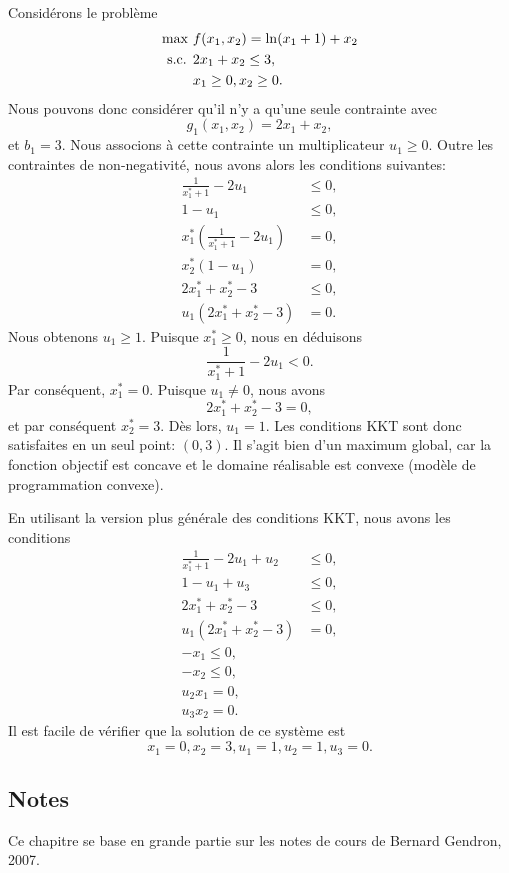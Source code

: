 \begin{example}
Considérons le problème
\begin{align*}
\max\ & f(x_1,x_2) = \ln(x_1 +1) + x_2\\
\mbox{s.c. } & 2x_1 + x_2 \leq 3, \\
& x_1 \geq 0, x_2 \geq 0.
\end{align*}
Nous pouvons donc considérer qu'il n'y a qu'une seule contrainte avec
\[
g_1(x_1,x_2) = 2x_1 + x_2,
\]
et $b_1 = 3$.
Nous associons à cette contrainte un multiplicateur $u_1 \geq 0$.
Outre les contraintes de non-negativité, nous avons alors les conditions suivantes:
\begin{align*}
\frac{1}{x_1^*+1} - 2u_1 &\leq 0, \\
1-u_1 &\leq 0, \\
x_1^* \left( \frac{1}{x_1^*+1} - 2u_1 \right) &= 0, \\
x_2^*(1-u_1) &= 0, \\
2x_1^*+x_2^*-3 &\leq 0, \\
u_1(2x_1^*+x_2^*-3) &= 0.
\end{align*}
Nous obtenons $u_1 \geq 1$. Puisque $x_1^* \geq 0$, nous en déduisons
\[
\frac{1}{x_1^*+1} - 2u_1 < 0.
\]
Par conséquent, $x_1^* = 0$.
Puisque $u_1 \ne 0$, nous avons
\[
2x_1^* + x_2^* - 3 = 0,
\]
et par conséquent $x_2^* = 3$. Dès lors, $u_1 = 1$.
Les conditions KKT sont donc satisfaites en un seul point: $(0,3)$.
Il s'agit bien d'un maximum global, car la fonction objectif est concave et le domaine réalisable est convexe (modèle de programmation convexe).

En utilisant la version plus générale des conditions KKT, nous avons les conditions
\begin{align*}
\frac{1}{x_1^*+1} - 2u_1 + u_2 &\leq 0, \\
1-u_1 +u_3 &\leq 0, \\
2x_1^*+x_2^*-3 &\leq 0, \\
u_1(2x_1^*+x_2^*-3) &= 0, \\
-x_1 \leq 0,\\
-x_2 \leq 0,\\
u_2x_1 = 0,\\
u_3x_2 = 0.
\end{align*}
Il est facile de vérifier que la solution de ce système est
\[
x_1 = 0, x_2 = 3, u_1 = 1, u_2 = 1, u_3 = 0.
\]
\end{example}

\begin{small}
\section{Notes}

Ce chapitre se base en grande partie sur les notes de cours de Bernard Gendron, 2007.

\end{small}
